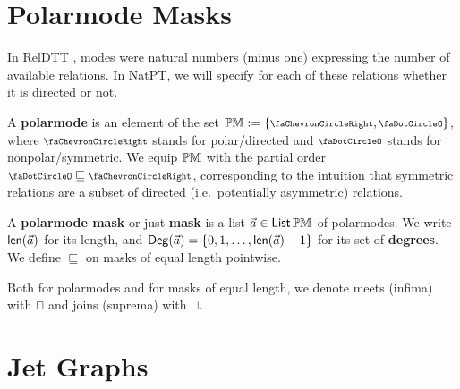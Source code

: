 \documentclass[a4paper]{memoir}
\begin{document}

\section{Polarmode Masks} \label{sec:mask}
In RelDTT \cite{reldtt}, modes were natural numbers (minus one) expressing the number of available relations.
In NatPT, we will specify for each of these relations whether it is directed or not.
\begin{definition}
	\label{def:polarmode}
	\label{def:polarmode-order}
	A \textbf{polarmode} is an element of the set $\Polarmode := \accol{\ypolar, \npolar}$, where $\ypolar$ stands for polar/directed and $\npolar$ stands for nonpolar/symmetric.
	We equip ${\mathbb{PM}}$ with the partial order $\npolar \sqsubseteq \ypolar$, corresponding to the intuition that symmetric relations are a subset of directed (i.e.\ potentially asymmetric) relations.
	
	A \textbf{polarmode mask} or just \textbf{mask} is a list $\vec a \in {\mathsf{List}}\,{\mathbb{PM}}$ of polarmodes. We write $\mathsf{len}(\vec a)$ for its length,
	and ${\mathsf{Deg}}(\vec a) = \mathopen{}\left\{ 0, 1, \ldots, \mathsf{len}(\vec a) - 1 \right\}\mathclose{}$ for its set of \textbf{degrees}.
	We define $\sqsubseteq$ on masks of equal length pointwise.
	
	Both for polarmodes and for masks of equal length, we denote meets (infima) with $\sqcap$ and joins (suprema) with $\sqcup$.
\end{definition}

\section{Jet Graphs} \label{sec:jetgph}
\end{document}
